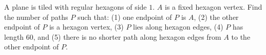 A plane is tiled with regular hexagons of side $1$. $A$ is a fixed hexagon vertex.
Find the number of paths $P$ such that:
(1) one endpoint of $P$ is $A$,
(2) the other endpoint of $P$ is a hexagon vertex,
(3) $P$ lies along hexagon edges,
(4) $P$ has length $60$, and
(5) there is no shorter path along hexagon edges from $A$ to the other endpoint of $P$.